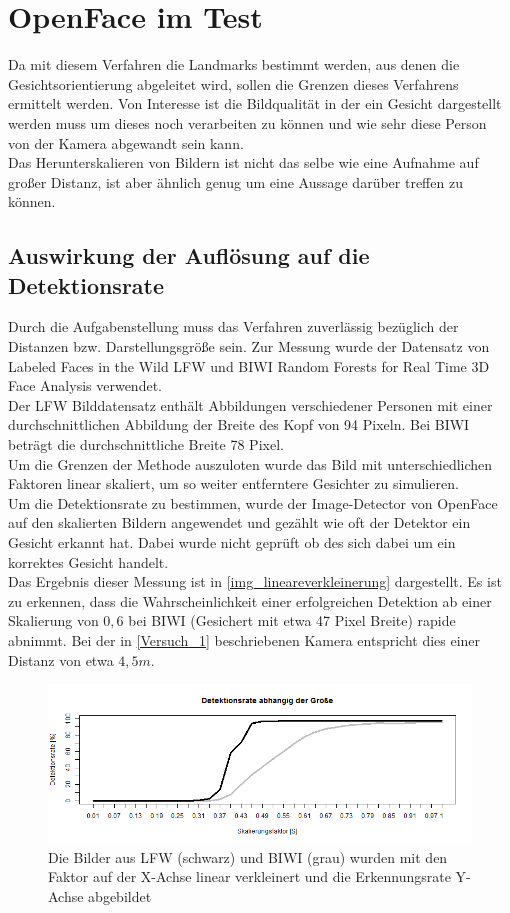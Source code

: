 \section{OpenFace im Test}
Da mit diesem Verfahren die Landmarks bestimmt werden, aus denen die Gesichtsorientierung abgeleitet wird, sollen die Grenzen dieses Verfahrens ermittelt werden. Von Interesse ist die Bildqualität in der ein Gesicht dargestellt werden muss um dieses noch verarbeiten zu können und wie sehr diese Person von der Kamera abgewandt sein kann.\\
Das Herunterskalieren von Bildern ist nicht das selbe wie eine Aufnahme auf großer Distanz, ist aber ähnlich genug um eine Aussage darüber treffen zu können.
\subsection{Auswirkung der Auflösung auf die Detektionsrate}
Durch die Aufgabenstellung muss das Verfahren zuverlässig bezüglich der Distanzen bzw. Darstellungsgröße sein. Zur Messung wurde der Datensatz von Labeled Faces in the Wild LFW \cite{database_Face} und BIWI Random Forests for Real Time 3D Face Analysis \cite{database_Face_Ori} verwendet.\\
Der LFW Bilddatensatz enthält Abbildungen verschiedener Personen mit einer durchschnittlichen Abbildung der Breite des Kopf von 94 Pixeln. Bei BIWI beträgt die durchschnittliche Breite 78 Pixel.\\
Um die Grenzen der Methode auszuloten wurde das Bild mit unterschiedlichen Faktoren linear skaliert, um so weiter entferntere Gesichter zu simulieren.\\
Um die Detektionsrate zu bestimmen, wurde der Image-Detector von OpenFace auf den skalierten Bildern angewendet und gezählt wie oft der Detektor ein Gesicht erkannt hat. Dabei wurde nicht geprüft ob des sich dabei um ein korrektes Gesicht handelt.\\
Das Ergebnis dieser Messung ist in \autoref{img_lineareverkleinerung} dargestellt. Es ist zu erkennen, dass die Wahrscheinlichkeit einer erfolgreichen Detektion ab einer Skalierung von $0,6$ bei BIWI (Gesichert mit etwa 47 Pixel Breite) rapide abnimmt. Bei der in \autoref{Versuch_1} beschriebenen Kamera entspricht dies einer Distanz von etwa $4,5m$.\\
\begin{figure}
	\centering
	\includegraphics[width=\linewidth]{img_Skalierung/Gesicht_Rate}
	\caption{Die Bilder aus LFW \cite{database_Face} (schwarz) und BIWI \cite{database_Face_Ori} (grau) wurden mit den Faktor auf der X-Achse linear verkleinert und die Erkennungsrate Y-Achse abgebildet}
	\label{img_lineareverkleinerung}
\end{figure}
